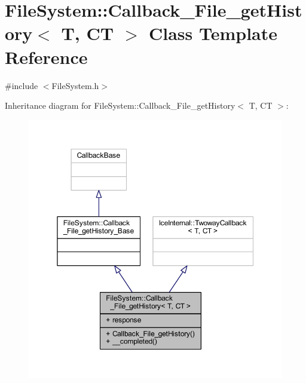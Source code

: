 \hypertarget{class_file_system_1_1_callback___file__get_history}{}\section{File\+System\+:\+:Callback\+\_\+\+File\+\_\+get\+History$<$ T, C\+T $>$ Class Template Reference}
\label{class_file_system_1_1_callback___file__get_history}


{\ttfamily \#include $<$File\+System.\+h$>$}



Inheritance diagram for File\+System\+:\+:Callback\+\_\+\+File\+\_\+get\+History$<$ T, C\+T $>$\+:
\nopagebreak
\begin{figure}[H]
\begin{center}
\leavevmode
\includegraphics[width=350pt]{class_file_system_1_1_callback___file__get_history__inherit__graph}
\end{center}
\end{figure}


